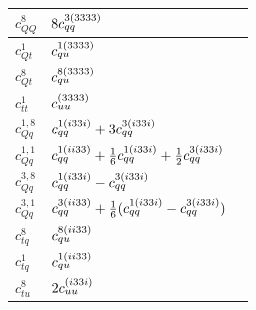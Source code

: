 \documentclass[withindex,glossary]{cam-thesis}
\newcommand*{\tmp}[4]{\ensuremath{%
    {#4%
    \ifx\empty#3\empty\ifx\empty#1\empty\else^{#1}\fi\else^{#1(#3)}\fi%
    \ifx\empty#2\empty\else_{#2}\fi}%
}}
\newcommand*{\ccc}[4][]{\tmp{#2}{#3}{#4}{#1{c}}}
\begin{document}
\begin{table}[htbp]
\begin{center}
{\begin{tabular}{lll}
    $c_{QQ}^8$       &         $8\ccc{3}{qq}{3333}$\\  \hline
 $c_{Qt}^1$         &         $\ccc{1}{qu}{3333}$\\   \hline
 $c_{Qt}^8$         &         $\ccc{8}{qu}{3333}$\\   \hline
  $c_{tt}^1$         &     $\ccc{}{uu}{3333}$  \\    \hline
 $c_{Qq}^{1,8}$       &      $\ccc{1}{qq}{i33i}+3\ccc{3}{qq}{i33i}$     \\   \hline
  $c_{Qq}^{1,1}$         &   $\ccc{1}{qq}{ii33}+\frac{1}{6}\ccc{1}{qq}{i33i}+\frac{1}{2}\ccc{3}{qq}{i33i} $   \\    \hline
   $c_{Qq}^{3,8}$         &   $\ccc{1}{qq}{i33i}-\ccc{3}{qq}{i33i} $   \\   \hline
  $c_{Qq}^{3,1}$          &     $\ccc{3}{qq}{ii33}+\frac{1}{6}(\ccc{1}{qq}{i33i}-\ccc{3}{qq}{i33i}) $   \\     \hline
   $c_{tq}^{8}$         &  $ \ccc{8}{qu}{ii33}   $ \\    \hline
   $c_{tq}^{1}$       &   $  \ccc{1}{qu}{ii33} $\\    \hline
   $c_{tu}^{8}$      &   $2\ccc{}{uu}{i33i}$  \\     \hline

\end{tabular}}
\end{center}
\end{table}
\end{document}

